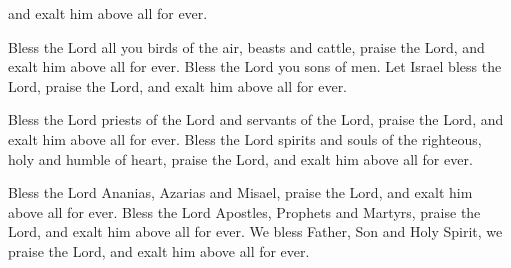 \documentclass{article}
\begin{document}
\begin{service}
\begin{multicols}{2}
{			and exalt him above all for ever.
			\item Bless the Lord all you birds of the air, beasts and cattle, praise the
			Lord, and exalt him above all for ever. Bless the Lord you sons of men. Let
			Israel bless the Lord, praise the Lord, and exalt him above all for ever.
			\item Bless the Lord priests of the Lord and servants of the Lord, praise
			the Lord, and exalt him above all for ever. Bless the Lord spirits and souls
			of the righteous, holy and humble of heart, praise the Lord, and exalt him
			above all for ever.
			\item  Bless the Lord Ananias, Azarias and Misael, praise the Lord, and exalt
			him above all for ever. Bless the Lord Apostles, Prophets and Martyrs, praise
			the Lord, and exalt him above all for ever. We bless Father, Son and Holy
			Spirit, we praise the Lord, and exalt him above all for ever.
		}
		\rest

	\end{multicols}
\end{service}
\end{document}
